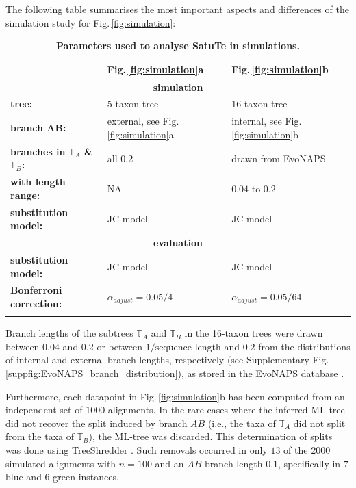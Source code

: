 \medskip

The following table summarises the most important aspects and differences of the simulation study for Fig.\,\ref{fig:simulation}:

\begin{longtable}{|p{}|p{}|p{}|}
\hline
   & \textbf{Fig.\,\ref{fig:simulation}a}&  \textbf{Fig.\,\ref{fig:simulation}b}\\
      \hline
      \hline
      \multicolumn{3}{|c|}{\textbf{simulation}}\\
      \hline
     \textbf{tree:} & 5-taxon tree & 16-taxon tree\\\hline
     \textbf{branch AB:} & 
        external, see Fig.\,\ref{fig:simulation}a
        & internal, see Fig.\,\ref{fig:simulation}b\\\hline
     \textbf{branches in $\mathbb{T}_A$ \& $\mathbb{T}_B$:} & 
      all 0.2 &
      drawn from EvoNAPS\\
      \hline
     \textbf{\hspace{1em}with length range:} & NA & $0.04$ to $0.2$\\\hline
     \textbf{substitution model:} & JC model & JC model \\\hline
      \hline 
      \multicolumn{3}{|c|}{\textbf{evaluation}}\\
      \hline 
     \textbf{substitution model:} & JC model & JC model \\\hline
     \textbf{Bonferroni correction:} &  
       $\alpha_{adjust} = 0.05/4$ & $\alpha_{adjust} = 0.05/64$\\
   \hline
   \caption{\textbf{Parameters used to analyse SatuTe in simulations.}}\label{tab:Fig2}
\end{longtable}

Branch lengths of the subtrees $\mathbb{T}_A$ and $\mathbb{T}_B$ in the 16-taxon trees were drawn between $0.04$ and $0.2$ or between $1/\mbox{sequence-length}$  and $0.2$ from the distributions of internal and external branch lengths, respectively  (see Supplementary Fig.\,\ref{suppfig:EvoNAPS_branch_distribution}), as stored in the EvoNAPS database . 

\medskip

\noindent Furthermore, each datapoint in Fig.\,\ref{fig:simulation}b has been computed from an independent set of $1000$ alignments. In the rare cases where the inferred ML-tree did not recover the split induced by branch $AB$ (i.e., the taxa of $\mathbb{T}_A$ did not split from the taxa of $\mathbb{T}_B$), the ML-tree was discarded. This determination of splits was done using TreeShredder . Such removals occurred in only $13$ of the $2000$ simulated alignments with $n=100$ and an $AB$ branch length $0.1$, specifically in $7$ {\color{MLtree} blue} and $6$ {\color{MLtreeBonferroni}green} instances.

